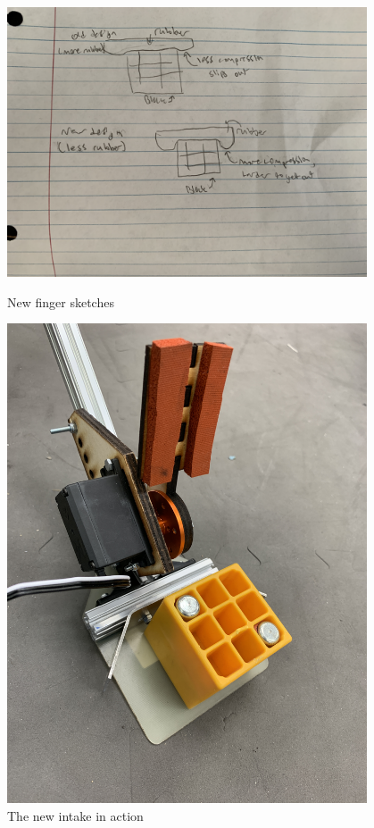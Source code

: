 \begin{figure}[ht]
\centering
\begin{minipage}[b]{.48\textwidth}
  \centering
  \includegraphics[width=0.95\textwidth]{Meetings/December/12-03-21/12-3-21_Hardware_Figure1 - Nathan Forrer.jpg}
  \caption{New finger sketches}
  \label{fig:pic1}
\end{minipage}%
\hfill%
\begin{minipage}[b]{.48\textwidth}
  \centering
  \includegraphics[width=0.95\textwidth]{Meetings/December/12-03-21/12-3-21_Hardware_figure2 - Nathan Forrer.JPG}
  \caption{The new intake in action}
  \label{fig:pic2}
\end{minipage}
\end{figure}



